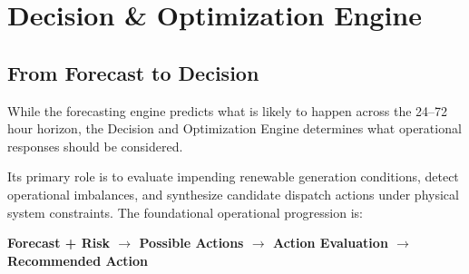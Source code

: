 \section{Decision \& Optimization Engine}
\label{sec:decision_optimization}

\subsection{From Forecast to Decision}
\label{subsec:from_forecast_to_decision}

While the forecasting engine predicts what is likely to happen across the 24--72 hour horizon, the Decision and Optimization Engine determines what operational responses should be considered.

Its primary role is to evaluate impending renewable generation conditions, detect operational imbalances, and synthesize candidate dispatch actions under physical system constraints. The foundational operational progression is:
\begin{center}
    \textbf{\color{primaryNavy}Forecast + Risk $\longrightarrow$ Possible Actions $\longrightarrow$ Action Evaluation $\longrightarrow$ Recommended Action}
\end{center}

